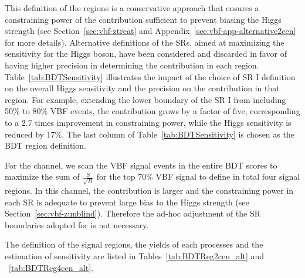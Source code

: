 This definition of the regions is a conservative approach that ensures a constraining power of the \zjets{} contribution sufficient to prevent biasing the Higgs strength (see Section~\ref{sec:vbf-ztreat} and Appendix~\ref{sec:vbf-app-alternative2cen} for more details). 
Alternative definitions of the SRs, aimed at maximizing the sensitivity for the Higgs boson, 
have been considered and discarded in favor of having higher precision in determining the \zjets{} contribution in each region.
Table~\ref{tab:BDTSensitivity} illustrates the impact of the choice of SR I definition on the overall Higgs sensitivity and 
the precision on the \zjets{} contribution in that region.
For example, extending the lower boundary of the SR I from including 50\% to 80\% VBF events, 
the \zjets{} contribution grows by a factor of five, corresponding to a 2.7 times improvement in constraining power, while the Higgs sensitivity is reduced by 17\%.   The last column of Table~\ref{tab:BDTSensitivity} is chosen as the BDT region definition. 

For the \fourcentral channel, we scan the VBF signal events in the entire BDT scores to maximize the sum of $\frac{S}{\sqrt{B}}$ for the top 70\% VBF signal to define in total four signal regions. In this channel, the \zjets{} contribution is larger and the constraining power in each SR is adequate to prevent large bias to the Higgs strength (see Section~\ref{sec:vbf-zunblind}).
Therefore the ad-hoc adjustment of the SR boundaries adopted for \twocentral is not necessary.

The definition of the signal regions, the yields of each processes and the estimation of sensitivity are listed in Tables~\ref{tab:BDTReg2cen_alt} and ~\ref{tab:BDTReg4cen_alt}. 


